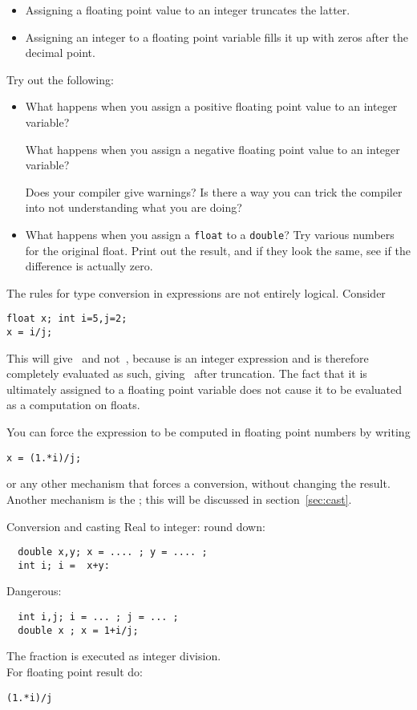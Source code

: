 \begin{itemize}
\item Assigning a floating point value to an integer truncates the
  latter.
\item Assigning an integer to a floating point variable fills it up
  with zeros after the decimal point.
\end{itemize}

\begin{exercise}
  \label{ex:float-convert}
  Try out the following:
  \begin{itemize}
  \item What happens when you assign a positive floating
    point value to an integer variable?

   What happens when you assign a negative floating
    point value to an integer variable?

    Does your compiler give warnings?
    Is there a way you can trick the compiler into not understanding what you are doing?
  \item What happens when you assign a \lstinline{float} to a \lstinline{double}?
    Try various numbers for the original float. 
    Print out the result, and if they look the same, see if the difference is actually zero.
  \end{itemize}
\end{exercise}

The rules for type conversion in expressions are not entirely
logical. Consider
\begin{lstlisting}
float x; int i=5,j=2;
x = i/j;
\end{lstlisting}
This will give~ and not~, because  is an integer
expression and is therefore completely evaluated as such, giving~
after truncation. The fact
that it is ultimately assigned to a floating point variable does not
cause it to be evaluated as a computation on floats.

You can force the expression to be computed in floating point numbers
by writing
\begin{lstlisting}
x = (1.*i)/j;
\end{lstlisting}
or any other mechanism that forces a conversion, without changing the
result.  Another mechanism is the ; this will be
discussed in section~\ref{sec:cast}.

\begin{slide}{Conversion and casting}
  \label{sl:convert-cast}
  Real to integer: round down:
\begin{lstlisting}
  double x,y; x = .... ; y = .... ;
  int i; i =  x+y:
\end{lstlisting}
Dangerous:
\begin{lstlisting}
  int i,j; i = ... ; j = ... ; 
  double x ; x = 1+i/j;
\end{lstlisting}
The fraction is executed as integer division.\\
For floating point result do:
\begin{lstlisting}
(1.*i)/j
\end{lstlisting}
\end{slide}

